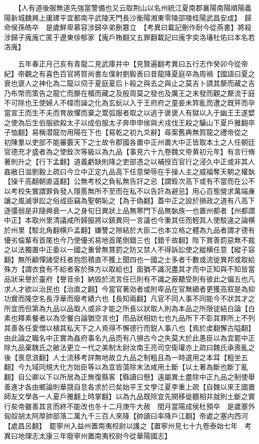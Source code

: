 　　【人有道後服無道先強當警備也又云取荆山以名州統江夏南郡襄陽南陽順陽義陽新城魏興上庸建平宜都南平武陵天門長沙衡陽湘東零陵邵陵桂陽武昌安成】　歸命侯孫皓卒　是歲鮮卑慕容涉歸卒弟刪簒立　【考異曰載記刪作耐今從燕書】將殺涉歸子廆廆亡匿于遼東徐郁家【廆戶賄翻又五罪翻載記曰廆字奕洛瓖杜佑曰本名若洛廆】

　　五年春正月己亥有青龍二見武庫井中【見賢遍翻考異曰五行志作癸卯今從帝紀】帝觀之有喜色百官將賀尚書左僕射劉毅表曰昔龍降夏庭卒為周禍【國語曰夏之衰也褒人之神化為二龍以伺于夏庭夏后卜殺之與去之與止之莫吉卜請其漦而藏之吉乃布幣而策告之龍亡而漦在櫝而藏之及殷周莫之發也及厲王之末發而觀之漦流于庭不可除也王使婦人不幃而譟之化為玄蚖以入于王府府之童妾未筓亂而遭之既笄而孕當宣王而生不夫而育故懼而棄之鬻弧服者取之以逃于褒褒人有獄以入于幽王王遂嬖之使為后生伯服欲殺太子以成伯服太子奔申申侯與犬戎伐王殺之驪山下夏戶雅翻卒子恤翻】易稱潜龍勿用陽在下也【易乾之初九爻辭】尋案舊典無賀龍之禮帝從之　初陳羣以吏部不能審覈天下之士故令郡國各置中正州置大中正皆取本土之人任朝廷官德充才盛者為之使銓次等級以為九品【事見六十九卷魏文帝黄初元年】有言行脩著則升之【行下孟翻】道義虧缺則降之吏部憑之以補授百官行之浸久中正或非其人姦敝日滋劉毅上疏曰今立中正定九品高下任意榮辱在手操人主之威福奪天朝之權埶【操千高翻朝直遥翻】公無考校之負私無告訐之忌【謂銓次高下或有不當而在公不以考校失實謂罪負發人隱慝無所不至而在私不以告訐為避忌】用心百態營求萬端亷讓之風滅爭訟之俗成臣竊為聖朝恥之【為于偽翻】蓋中正之設於損政之道有八高下逐彊弱是非隨興衰一人之身旬日異狀上品無寒門下品無埶族一也置州都者【州都謂中正】本取州里清議咸所歸服將以鎮異同一言議也今重其任而輕其人使駁違之論横於州里【駁北角翻横戶孟翻】嫌讐之隙結於大臣二也本立格之體為九品者謂才德有優劣倫輩有首尾也今乃使優劣易地首尾倒錯三也【錯千故翻】陛下賞善罰惡無不裁之以法獨置中正委以一國之重曾無賞罰之防又禁人不得訴訟使之縱横任意【縱子容翻】無所顧憚諸受枉者抱怨積直不獲上聞四也一國之士多者千數或流徙異邦或取給殊方【謂衣食有不給者客於殊方以取給也】面猶不識况盡其才而中正知與不知皆當品狀采譽於臺府【譽音余】納毁於流言任已則有不識之蔽聽受則有彼此之偏五也凡求人才欲以治民也【治直之翻】今當官著効者或附卑品在官無績者更獲高叙是為抑功實而隆空名長浮華而廢考績六也【長知兩翻】凡官不同人事不同能今不狀其才之所宜而但第為九品以品取人或非才能之所長以狀取人則為本品之所限徒結白論【白素也釋素餐者以為空餐白論猶空言也】而品狀相妨七也九品所下不彰其罪所上不列其善各任愛憎以植其私天下之人焉得不懈德行而鋭人事八也【焉於䖍翻懈古隘翻】由此論之職名中正實為姦府事名九品而有八損古今之失莫大於此愚臣以為宜罷中正除九品棄魏氏之敝法更立一代之美制太尉汝南王亮司空衛瓘亦上疏曰魏氏承喪亂之後【喪息浪翻】人士流移考詳無地故立九品之制粗且為一時選用之本耳【粗坐五翻】今九域同規大化方始臣等以為宜皆蕩除末法咸用土斷【以土著為斷也斷丁亂翻】自公卿以下以所居為正無復縣客【縣讀曰懸】遠屬異土盡除中正九品之制使舉善進才各由鄉論則華競自息各求於已矣始平王文學江夏李重上疏【自魏以來王國置師友文學各一人夏戶雅翻上時掌翻】以為九品既除宜先開移徙聽相并就則土斷之實行矣帝雖善其言而終不能改也冬十二月庚午大赦　閏月當陽成侯杜預卒　是歲塞外匈奴胡太阿厚帥部落二萬九千三百人來降【帥讀曰率降戶江翻】帝處之塞内西河【處昌呂翻】　罷寧州入益州置南夷校尉以護之【置寧州見七十九卷泰始七年　考異曰地理志太康三年廢寧州置南夷校尉今從華陽國志】

